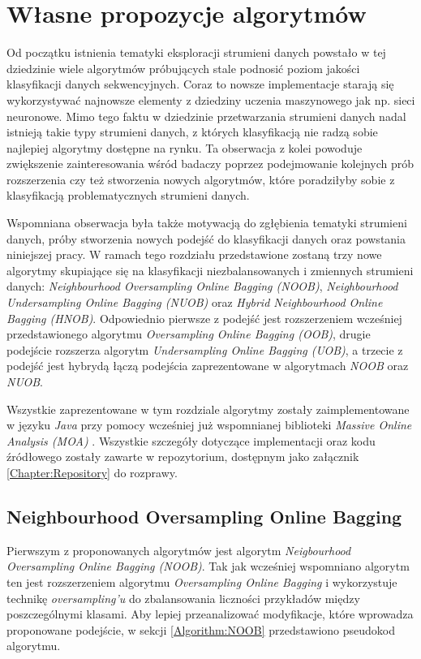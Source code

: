 \chapter{Własne propozycje algorytmów}

\noindent Od początku istnienia tematyki eksploracji strumieni danych powstało w tej dziedzinie wiele algorytmów próbujących stale podnosić poziom jakości klasyfikacji danych sekwencyjnych. Coraz to nowsze implementacje starają się wykorzystywać najnowsze elementy z dziedziny uczenia maszynowego jak np. sieci neuronowe. Mimo tego faktu w dziedzinie przetwarzania strumieni danych nadal istnieją takie typy strumieni danych, z których klasyfikacją nie radzą sobie najlepiej algorytmy dostępne na rynku. Ta obserwacja z kolei powoduje zwiększenie zainteresowania wśród badaczy poprzez podejmowanie kolejnych prób rozszerzenia czy też stworzenia nowych algorytmów, które poradziłyby sobie z klasyfikacją problematycznych strumieni danych.

Wspomniana obserwacja była także motywacją do zgłębienia tematyki strumieni danych, próby stworzenia nowych podejść do klasyfikacji danych oraz powstania niniejszej pracy. W ramach tego rozdziału przedstawione zostaną trzy nowe algorytmy skupiające się na klasyfikacji niezbalansowanych i zmiennych strumieni danych: \textit{Neighbourhood Oversampling Online Bagging (NOOB)}, \textit{Neighbourhood Undersampling Online Bagging (NUOB)} oraz \textit{Hybrid Neighbourhood Online Bagging (HNOB)}. Odpowiednio pierwsze z podejść jest rozszerzeniem wcześniej przedstawionego algorytmu \textit{Oversampling Online Bagging (OOB)}, drugie podejście rozszerza algorytm \textit{Undersampling Online Bagging (UOB)}, a trzecie z podejść jest hybrydą łączą podejścia zaprezentowane w algorytmach \textit{NOOB} oraz \textit{NUOB}.

Wszystkie zaprezentowane w tym rozdziale algorytmy zostały zaimplementowane w języku \textit{Java} przy pomocy wcześniej już wspomnianej biblioteki \textit{Massive Online Analysis (MOA)} \cite{Article:MOA}. Wszystkie szczegóły dotyczące implementacji oraz kodu źródłowego zostały zawarte w repozytorium, dostępnym jako załącznik \ref{Chapter:Repository} do rozprawy.

\newpage

\section{Neighbourhood Oversampling Online Bagging}

\noindent Pierwszym z proponowanych algorytmów jest algorytm \textit{Neigbourhood Oversampling Online Bagging (NOOB)}. Tak jak wcześniej wspomniano algorytm ten jest rozszerzeniem algorytmu \textit{Oversampling Online Bagging} i wykorzystuje technikę \textit{oversampling'u} do zbalansowania liczności przykładów między poszczególnymi klasami. Aby lepiej przeanalizować modyfikacje, które wprowadza proponowane podejście, w sekcji \ref{Algorithm:NOOB} przedstawiono pseudokod algorytmu.

